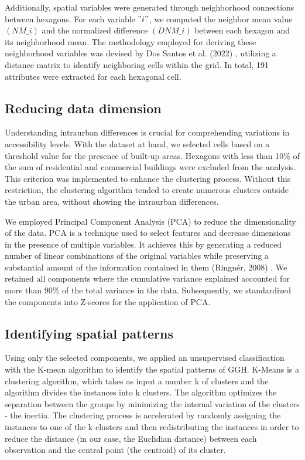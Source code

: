\documentclass[conference,final,]{IEEEtran}
\begin{document}
Additionally, spatial variables were generated through neighborhood
connections between hexagons. For each variable \("i"\), we computed the
neighbor mean value \((NM\_i)\) and the normalized difference
\((DNM\_i)\) between each hexagon and its neighborhood mean. The
methodology employed for deriving these neighborhood variables was
devised by Dos Santos et al. (2022) , utilizing a distance matrix to
identify neighboring cells within the grid. In total, 191 attributes
were extracted for each hexagonal cell.

\hypertarget{reducing-data-dimension}{%
\subsection{Reducing data dimension}\label{reducing-data-dimension}}

Understanding intraurban differences is crucial for comprehending
variations in accessibility levels. With the dataset at hand, we
selected cells based on a threshold value for the presence of built-up
areas. Hexagons with less than 10\% of the sum of residential and
commercial buildings were excluded from the analysis. This criterion was
implemented to enhance the clustering process. Without this restriction,
the clustering algorithm tended to create numerous clusters outside the
urban area, without showing the intraurban differences.

We employed Principal Component Analysis (PCA) to reduce the
dimensionality of the data. PCA is a technique used to select features
and decrease dimensions in the presence of multiple variables. It
achieves this by generating a reduced number of linear combinations of
the original variables while preserving a substantial amount of the
information contained in them (Ringnér, 2008) . We retained all
components where the cumulative variance explained accounted for more
than 90\% of the total variance in the data. Subsequently, we
standardized the components into Z-scores for the application of PCA.

\hypertarget{identifying-spatial-patterns}{%
\subsection{Identifying spatial
patterns}\label{identifying-spatial-patterns}}

Using only the selected components, we applied an unsupervised
classification with the K-mean algorithm to identify the spatial
patterns of GGH. K-Means is a clustering algorithm, which takes as input
a number k of clusters and the algorithm divides the instances into k
clusters. The algorithm optimizes the separation between the groups by
minimizing the internal variation of the clusters - the inertia. The
clustering process is accelerated by randomly assigning the instances to
one of the k clusters and then redistributing the instances in order to
reduce the distance (in our case, the Euclidian distance) between each
observation and the central point (the centroid) of its cluster.
\end{document}
